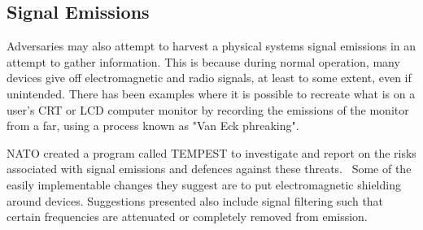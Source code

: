 \subsection{Signal Emissions}
Adversaries may also attempt to harvest a physical systems signal emissions in an attempt to gather information. This is because during
normal operation, many devices give off electromagnetic and radio signals, at least to some extent, even if unintended. There has been
examples where it is possible to recreate what is on a user's CRT or LCD computer monitor by recording the emissions of the monitor
from a far, using a process known as "Van Eck phreaking".~\cite{monitor}~\cite{lcds}

NATO created a program called TEMPEST to investigate and report on the risks associated with signal emissions and defences
against these threats.~\cite{tempest} Some of the easily implementable changes they suggest are to put electromagnetic shielding
around devices. Suggestions presented also include signal filtering such that certain frequencies are attenuated or completely removed
from emission.

